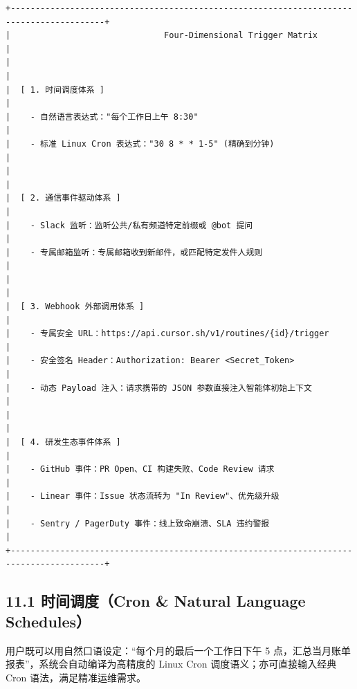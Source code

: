 \documentclass[10.5pt,a4paper,oneside]{report}
\begin{document}
\begin{lstlisting}
+-----------------------------------------------------------------------------------------+
|                               Four-Dimensional Trigger Matrix                           |
|                                                                                         |
|  [ 1. 时间调度体系 ]                                                                     |
|    - 自然语言表达式："每个工作日上午 8:30"                                                |
|    - 标准 Linux Cron 表达式："30 8 * * 1-5" (精确到分钟)                                 |
|                                                                                         |
|  [ 2. 通信事件驱动体系 ]                                                                 |
|    - Slack 监听：监听公共/私有频道特定前缀或 @bot 提问                                   |
|    - 专属邮箱监听：专属邮箱收到新邮件，或匹配特定发件人规则                              |
|                                                                                         |
|  [ 3. Webhook 外部调用体系 ]                                                             |
|    - 专属安全 URL：https://api.cursor.sh/v1/routines/{id}/trigger                        |
|    - 安全签名 Header：Authorization: Bearer <Secret_Token>                              |
|    - 动态 Payload 注入：请求携带的 JSON 参数直接注入智能体初始上下文                     |
|                                                                                         |
|  [ 4. 研发生态事件体系 ]                                                                 |
|    - GitHub 事件：PR Open、CI 构建失败、Code Review 请求                                 |
|    - Linear 事件：Issue 状态流转为 "In Review"、优先级升级                               |
|    - Sentry / PagerDuty 事件：线上致命崩溃、SLA 违约警报                                  |
+-----------------------------------------------------------------------------------------+
\end{lstlisting}

\subsection{11.1 时间调度（Cron \& Natural Language
Schedules）}\label{ux65f6ux95f4ux8c03ux5ea6cron-natural-language-schedules}

用户既可以用自然口语设定：``每个月的最后一个工作日下午 5
点，汇总当月账单报表''，系统会自动编译为高精度的 Linux Cron
调度语义；亦可直接输入经典 Cron 语法，满足精准运维需求。
\end{document}
